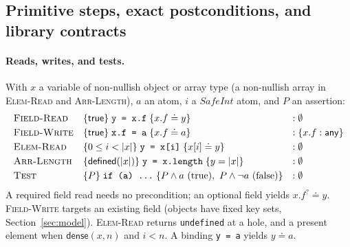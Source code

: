 \documentclass[10pt,a4paper]{article}
\theoremstyle{definition}
\theoremstyle{remark}
\newcommand{\kw}[1]{\mathsf{#1}}
\newcommand{\any}{\kw{any}}
\newcommand{\dense}{\kw{dense}}
\newcommand{\len}[1]{|#1|}
\newcommand{\hoare}[3]{\{#1\}\;#2\;\{#3\}}
\newcommand{\code}[1]{\texttt{#1}}
\begin{document}
\subsection{Primitive steps, exact postconditions, and library contracts}

\paragraph{Reads, writes, and tests.}
With $x$ a variable of non-nullish object or array type (a non-nullish
array in \textsc{Elem-Read} and \textsc{Arr-Length}), $a$ an atom, $i$ a
$\mathit{SafeInt}$ atom, and $P$ an assertion:
{\small\begin{displaymath}
\begin{array}{@{}lll@{}}
\textsc{Field-Read} & \hoare{\kw{true}}{\code{y = x.f}}{x.f\doteq y} & :\emptyset\\[3pt]
\textsc{Field-Write} & \hoare{\kw{true}}{\code{x.f = a}}{x.f\doteq a} & :\{x.f:\any\}\\[3pt]
\textsc{Elem-Read} & \hoare{0\le i<\len x}{\code{y = x[i]}}{x[i]\doteq y} & :\emptyset\\[3pt]
\textsc{Arr-Length} & \hoare{\kw{defined}(\len x)}{\code{y = x.length}}{y=\len x} & :\emptyset\\[3pt]
\textsc{Test} & \hoare{P}{\code{if (a) ...}}{P\wedge a\text{ (true)},\ P\wedge\neg a\text{ (false)}} & :\emptyset
\end{array}
\end{displaymath}}
A required field read needs no precondition; an optional field yields
$x.f^{?}\doteq y$. \textsc{Field-Write} targets an existing field
(objects have fixed key sets, Section~\ref{sec:model}). \textsc{Elem-Read}
returns \code{undefined} at a hole, and a present element when
$\dense(x,n)$ and $i<n$. A binding \code{y = a} yields $y\doteq a$.
\end{document}
